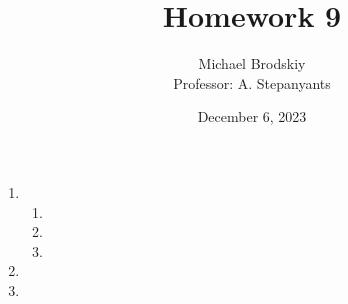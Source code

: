 


\title{Homework 9}
\date{December 6, 2023}
\author{Michael Brodskiy\\ \small Professor: A. Stepanyants}



\maketitle

\begin{enumerate}

  \item

    \begin{enumerate}

      \item 

      \item 

      \item 

    \end{enumerate}

  \item

  \item

\end{enumerate}



